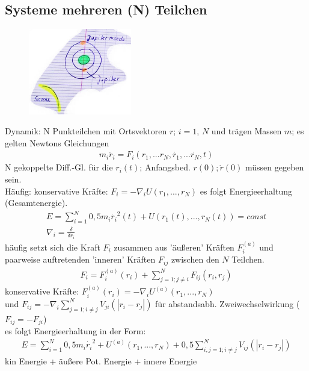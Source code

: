 \subsection{Systeme mehreren (N) Teilchen}
\begin{figure}[h]
\begin{center}
\includegraphics[width=0.4\textwidth]{Skizzen/Anhang1.jpg}
\end{center}
\caption{}
\end{figure}
Dynamik: N Punkteilchen mit Ortsvektoren $r$; $i=1$, $N$ und trägen Massen $m$; es gelten Newtons Gleichungen
\begin{align*}
m_i\ddot{r_i}=F_i (r_1,...r_N,\dot{r_1},...\dot{r_N},t)
\end{align*}
N gekoppelte Diff.-Gl. für die $r_i(t)$; Anfangsbed. $r(0); \dot{r}(0)$ müssen gegeben sein.\\
Häufig: konservative Kräfte: $F_i=-\nabla_i U(r_1,...,r_N)$ es folgt Energieerhaltung (Gesamtenergie).
\begin{align*}
E=\sum^N_{i=1} 0,5m_i\dot{r_i}^2(t)+U(r_1(t),...,r_N(t))=const\\
\nabla_i=\frac{\delta}{\delta r_i}
\end{align*}
häufig setzt sich die Kraft $F_i$ zusammen aus 'äußeren' Kräften $F_i^{(a)}$ und paarweise auftretenden 'inneren' Kräften $F_{ij}$ zwischen den $N$ Teilchen.
\begin{align*}
F_i=F_i^{(a)}(r_i) + \sum^N_{j=1; j\neq i}F_{ij}(r_i,r_j)
\end{align*}
konservative Kräfte: $F_i^{(a)}(r_i)=-\nabla_i U^{(a)}(r_1,...,r_N)$\\
und $F_{ij}=-\nabla_i\sum^N_{j=1; i\neq j}V_{ji}(|r_i-r_j|)$ für abstandsabh. Zweiwechselwirkung ($F_{ij}=-F_{ji}$)\\
es folgt Energieerhaltung in der Form:
\begin{align*}
E=\sum^N_{i=1}0,5m_i\dot{r_i}^2+U^{(a)}(r_1,...,r_N)+0,5\sum^N_{i,j=1; i\neq j}V_{ij}(|r_i-r_j|)
\end{align*}
kin Energie + äußere Pot. Energie + innere Energie
